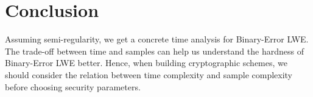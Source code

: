 \documentclass[a4paper]{article}
\theoremstyle{definition}
\theoremstyle{remark}
\begin{document}
\fi

\section{Conclusion}
Assuming semi-regularity, we get a concrete time analysis for Binary-Error LWE. The trade-off between time and samples can help us understand the hardness of Binary-Error LWE better. Hence, when building cryptographic schemes, we should consider the relation between time complexity and sample complexity before choosing security parameters. 

 
\end{document}
